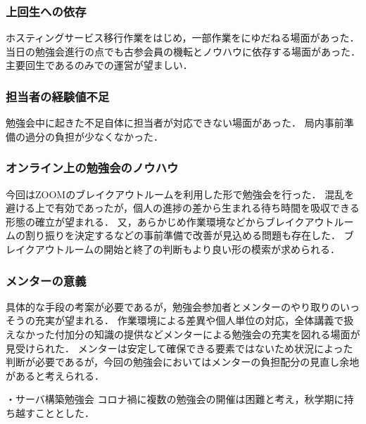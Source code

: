 \subsubsection*{上回生への依存}
ホスティングサービス移行作業をはじめ，一部作業を\fourthGrade{}にゆだねる場面があった．
当日の勉強会進行の点でも古参会員の機転とノウハウに依存する場面があった．主要回生である\secondgrade{}のみでの運営が望ましい．
\subsubsection*{担当者の経験値不足}
勉強会中に起きた不足自体に担当者が対応できない場面があった．
局内事前準備の過分の負担が少なくなかった．
\subsubsection*{オンライン上の勉強会のノウハウ}
今回はZOOMのブレイクアウトルームを利用した形で勉強会を行った．
混乱を避ける上で有効であったが，個人の進捗の差から生まれる待ち時間を吸収できる形態の確立が望まれる．
又，あらかじめ作業環境などからブレイクアウトルームの割り振りを決定するなどの事前準備で改善が見込める問題も存在した．
ブレイクアウトルームの開始と終了の判断もより良い形の模索が求められる．
\subsubsection*{メンターの意義}
具体的な手段の考案が必要であるが，勉強会参加者とメンターのやり取りのいっそうの充実が望まれる．
作業環境による差異や個人単位の対応，全体講義で扱えなかった付加分の知識の提供などメンターによる勉強会の充実を図れる場面が見受けられた．
メンターは安定して確保できる要素ではないため状況によった判断が必要であるが，今回の勉強会においてはメンターの負担配分の見直し余地があると考えられる．

・サーバ構築勉強会
コロナ禍に複数の勉強会の開催は困難と考え，秋学期に持ち越すこととした．

